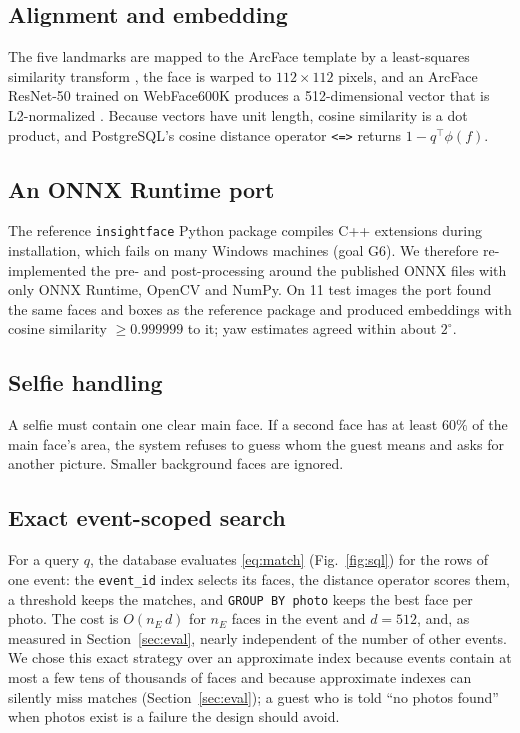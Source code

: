 \documentclass[conference]{IEEEtran}
\begin{document}
\subsection{Alignment and embedding}
The five landmarks are mapped to the ArcFace template by a least-squares similarity transform \cite{umeyama1991}, the face is warped to $112\times112$ pixels, and an ArcFace ResNet-50 trained on WebFace600K produces a 512-dimensional vector that is L2-normalized \cite{deng2022arcface,insightface}. Because vectors have unit length, cosine similarity is a dot product, and PostgreSQL's cosine distance operator \texttt{<=>} returns $1-q^{\top}\phi(f)$.

\subsection{An ONNX Runtime port}\label{sec:onnx}
The reference \texttt{insightface} Python package compiles C++ extensions during installation, which fails on many Windows machines (goal G6). We therefore re-implemented the pre- and post-processing around the published ONNX files with only ONNX Runtime, OpenCV and NumPy. On 11 test images the port found the same faces and boxes as the reference package and produced embeddings with cosine similarity $\ge0.999999$ to it; yaw estimates agreed within about $2^\circ$.

\subsection{Selfie handling}
A selfie must contain one clear main face. If a second face has at least $60\%$ of the main face's area, the system refuses to guess whom the guest means and asks for another picture. Smaller background faces are ignored.

\subsection{Exact event-scoped search}
For a query $q$, the database evaluates \eqref{eq:match} (Fig.~\ref{fig:sql}) for the rows of one event: the \texttt{event\_id} index selects its faces, the distance operator scores them, a threshold keeps the matches, and \texttt{GROUP BY photo} keeps the best face per photo. The cost is $O(n_E\,d)$ for $n_E$ faces in the event and $d=512$, and, as measured in Section~\ref{sec:eval}, nearly independent of the number of other events. We chose this exact strategy over an approximate index because events contain at most a few tens of thousands of faces and because approximate indexes can silently miss matches (Section~\ref{sec:eval}); a guest who is told ``no photos found'' when photos exist is a failure the design should avoid.
\end{document}
